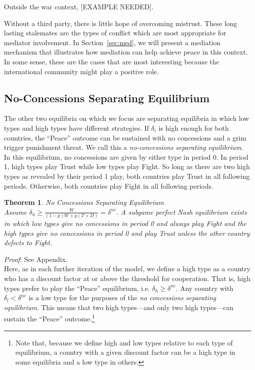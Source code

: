 \documentclass[12pt, letterpaper]{article}
\newcommand{\de}{\delta}
\newtheorem{theorem}{Theorem}
\begin{document}
Outside the war context, [EXAMPLE NEEDED].

Without a third party, there is little hope of overcoming mistrust. These long lasting stalemates are the types of conflict which are most appropriate for mediator involvement. In Section~\ref{sec:med}, we will present a mediation mechanism that illustrates how mediation can help achieve peace in this context. In some sense, these are the cases that are most interesting because the international community might play a positive role. 

\subsection{No-Concessions Separating Equilibrium}
\label{sec:ncse}
The other two equilibria on which we focus are separating equilibria in which low types and high types have different strategies. If $\delta_i$ is high enough for both countries, the ``Peace'' outcome can be sustained with no concessions and a grim trigger punishment threat. We call this a \emph{no-concessions separating equilibrium}. In this equilibrium, no concessions are given by either type in period 0. In period 1, high types play Trust while low types play Fight. So long as there are two high types as revealed by their period 1 play, both countries play Trust in all following periods. Otherwise, both countries play Fight in all following periods. 

\begin{theorem}
\emph{No Concessions Separating Equilibrium}\\
	Assume $\delta_h \geq \frac{W}{(1-p)W + p(T+D)}=\de^{nc}$. A subgame perfect Nash equilibrium exists in which low types give no concessions in period 0 and always play Fight and the high types give no concessions in period 0 and play Trust unless the other country defects to Fight.
	\label{theorem:1}
\end{theorem}
\emph{Proof}: See Appendix.
\\
Here, as in each further iteration of the model, we define a high type as a country who has a discount factor at or above the threshold for cooperation. That is, high types prefer to play the ``Peace'' equilibrium, i.e. $\delta_h \geq \delta^{nc}$. Any country with $\delta_l < \delta^{nc}$ is a low type for the purposes of the \emph{no concessions separating equilibrium}. This means that two high types---and only two high types---can sustain the ``Peace'' outcome.\footnote{Note that, because we define high and low types relative to each type of equilibrium, a country with a given discount factor can be a high type in some equilibria and a low type in others.}
\end{document}

